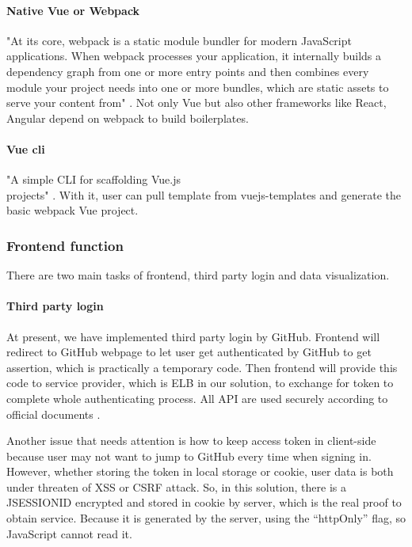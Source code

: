 \documentclass[conference]{IEEEtran}
\begin{document}
\paragraph{Native Vue or Webpack}

"At its core, webpack is a static module bundler for modern JavaScript applications. When webpack processes your application, it 
internally builds a dependency graph from one or more entry points and then combines every module your project needs into one or 
more bundles, which are static assets to serve your content from" \cite{Concepts28:online}. Not only Vue but also other frameworks like React, 
Angular depend on webpack to build boilerplates.

\paragraph{Vue cli}

"A simple CLI for scaffolding Vue.js \\projects" \cite{Introduc89:online}. With it, user can pull template from vuejs-templates and generate 
the basic webpack \+ Vue project.

\subsubsection{Frontend function}

There are two main tasks of frontend, third party login and data visualization.

\paragraph{Third party login}

At present, we have implemented third party login by GitHub. Frontend will redirect to GitHub webpage to let user get authenticated 
by GitHub to get assertion, which is practically a temporary code. Then frontend will provide this code to service provider, which 
is ELB in our solution, to exchange for token to complete whole authenticating process. All API are used securely according to official 
documents \cite{Authoriz26:online}.

Another issue that needs attention is how to keep access token in client-side because user may not want to jump to GitHub every time when signing in. However, whether storing the token in local storage or cookie, user data is both under threaten of XSS or CSRF attack. So, in this solution, there is a JSESSIONID encrypted and stored in cookie by server, which is the real proof to obtain service. Because it is generated by the server, using the “httpOnly” flag, so JavaScript cannot read it.
\end{document}
